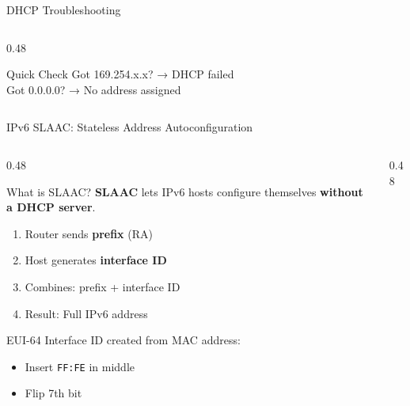 \documentclass[aspectratio=169, 11pt]{beamer}
\newcommand{\iconrouter}[1][0.6cm]{\resizebox{#1}{!}{\faNetworkWired}}
\newcommand{\keyterm}[1]{\textbf{\textcolor{rctcblue}{#1}}}
\begin{document}
\begin{frame}{DHCP Troubleshooting}
\begin{columns}[T]
\begin{column}{0.48\textwidth}
            \vspace{0.2em}
            \begin{exampleblock}{Quick Check}
                \small
                Got 169.254.x.x? → DHCP failed \\
                Got 0.0.0.0? → No address assigned
            \end{exampleblock}
        \end{column}
    \end{columns}
\end{frame}

\begin{frame}{IPv6 SLAAC: Stateless Address Autoconfiguration}
    \begin{columns}[T]
        \begin{column}{0.48\textwidth}
            \begin{block}{What is SLAAC?}
                \small
                \keyterm{SLAAC} lets IPv6 hosts configure themselves \textbf{without a DHCP server}.
                
                \vspace{0.2em}
                \begin{enumerate}\setlength{\itemsep}{1pt}
                    \item Router sends \textbf{prefix} (RA)
                    \item Host generates \textbf{interface ID}
                    \item Combines: prefix + interface ID
                    \item Result: Full IPv6 address
                \end{enumerate}
            \end{block}
            
            \vspace{0.2em}
            \begin{block}{EUI-64}
                \small
                Interface ID created from MAC address:
                \begin{itemize}\setlength{\itemsep}{1pt}
                    \item Insert \texttt{FF:FE} in middle
                    \item Flip 7th bit
                \end{itemize}
            \end{block}
        \end{column}
        \begin{column}{0.48\textwidth}
            \begin{center}
\end{center}
\end{column}
\end{columns}
\end{frame}
\end{document}
